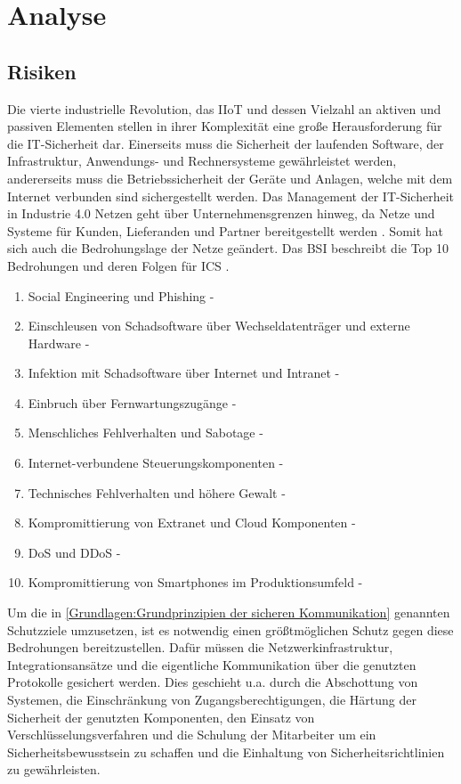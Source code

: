 \chapter{Analyse}

\section{Risiken}
Die vierte industrielle Revolution, das \ac{IIoT} und dessen Vielzahl an aktiven und passiven Elementen stellen in ihrer Komplexität eine große Herausforderung für die IT-Sicherheit dar. Einerseits muss die Sicherheit der laufenden Software, der Infrastruktur, Anwendungs- und Rechnersysteme gewährleistet werden, andererseits muss die Betriebssicherheit der Geräte und Anlagen, welche mit dem Internet verbunden sind sichergestellt werden. Das Management der IT-Sicherheit in Industrie 4.0 Netzen geht über Unternehmensgrenzen hinweg, da Netze und Systeme für Kunden, Lieferanden und Partner bereitgestellt werden \cite{DTAG2016}. Somit hat sich auch die Bedrohungslage der Netze geändert. Das \ac{BSI} beschreibt die Top 10 Bedrohungen und deren Folgen für \ac{ICS} \cite{ICSSec2016}.

\begin{enumerate}
    \item Social Engineering und Phishing - 
    \item Einschleusen von Schadsoftware über Wechseldatenträger und externe Hardware - 
    \item Infektion mit Schadsoftware über Internet und Intranet - 
    \item Einbruch über Fernwartungszugänge - 
    \item Menschliches Fehlverhalten und Sabotage - 
    \item Internet-verbundene Steuerungskomponenten - 
    \item Technisches Fehlverhalten und höhere Gewalt - 
    \item Kompromittierung von Extranet und Cloud Komponenten - 
    \item \ac{DoS} und \ac{DDoS} - 
    \item Kompromittierung von Smartphones im Produktionsumfeld - 
\end{enumerate}

Um die in \autoref{Grundlagen:Grundprinzipien der sicheren Kommunikation} genannten Schutzziele umzusetzen, ist es notwendig einen größtmöglichen Schutz gegen diese Bedrohungen bereitzustellen. Dafür müssen die Netzwerkinfrastruktur, Integrationsansätze und die eigentliche Kommunikation über die genutzten Protokolle gesichert werden. Dies geschieht u.a. durch die Abschottung von Systemen, die Einschränkung von Zugangsberechtigungen, die Härtung der Sicherheit der genutzten Komponenten, den Einsatz von Verschlüsselungsverfahren und die Schulung der Mitarbeiter um ein Sicherheitsbewusstsein zu schaffen und die Einhaltung von Sicherheitsrichtlinien zu gewährleisten.

